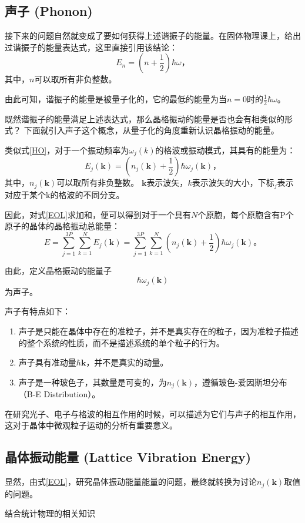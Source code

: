 \documentclass[declarePage]{ecnuthesis}
\begin{document}
\subsection{声子 (Phonon)}

接下来的问题自然就变成了要如何获得上述谐振子的能量。在固体物理课上，给出过谐振子的能量表达式，这里直接引用该结论：
\begin{equation}
    E_n=(n + \frac{1}{2})\hbar \omega \text{，} \label{HO}
\end{equation}
其中，$n$可以取所有非负整数。

由此可知，谐振子的能量是被量子化的，它的最低的能量为当$n=0$时的$\frac{1}{2} \hbar \omega$。

既然谐振子的能量满足上述表达式，那么晶格振动的能量是否也会有相类似的形式？%
下面就引入声子这个概念，从量子化的角度重新认识晶格振动的能量。

类似式\ref{HO}，对于一个振动频率为$\omega_j(k)$的格波或振动模式，其具有的能量为：
\begin{equation}
    E_j(\mathbf{k}) = (n_j(\mathbf{k}) + \frac{1}{2})\hbar \omega_j(\mathbf{k}) \text{，} \label{EOL}
\end{equation}
其中，$n_j(\mathbf{k})$可以取所有非负整数。%
$\mathbf{k}$表示波矢，$k$表示波矢的大小，下标$_j$表示对应于某个k的格波的不同分支。

因此，对式\ref{EOL}求加和，便可以得到对于一个具有$N$个原胞，每个原胞含有P个原子的晶体的晶格振动总能量：
\begin{equation}
    E = \sum_{j=1}^{3P}\sum_{k=1}^{N}E_j(\mathbf{k}) = \sum_{j=1}^{3P}\sum_{k=1}^{N}(n_j(\mathbf{k}) + \frac{1}{2})\hbar \omega_j(\mathbf{k}) \text{。} \label{EOC}
\end{equation}

由此，定义晶格振动的能量子
\begin{equation}
    \hbar \omega_j(\mathbf{k})
\end{equation}
为声子。

声子有特点如下：
\begin{enumerate}
    \item 声子是只能在晶体中存在的准粒子，并不是真实存在的粒子，因为准粒子描述的整个系统的性质，而不是描述系统的单个粒子的行为。
    \item 声子具有准动量$\hbar \mathbf{k}$，并不是真实的动量。
    \item 声子是一种玻色子，其数量是可变的，为$n_j(\mathbf{k})$，遵循玻色-爱因斯坦分布（B-E Distribution）。
\end{enumerate}

在研究光子、电子与格波的相互作用的时候，可以描述为它们与声子的相互作用，这对于晶体中微观粒子运动的分析有重要意义。

\subsection{晶体振动能量 (Lattice Vibration Energy)}

显然，由式\ref{EOL}，研究晶体振动能量能量的问题，最终就转换为讨论$n_j(\mathbf{k})$取值的问题。

结合统计物理的相关知识

\backmatter
\PrintReference
\end{document}
